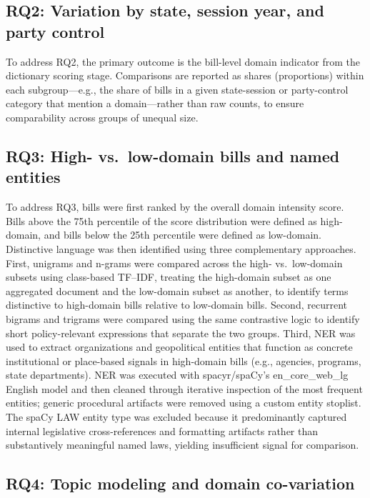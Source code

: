 \documentclass[10pt,twocolumn]{article}
\begin{document}
\subsection{RQ2: Variation by state, session year, and party
control}\label{rq2-variation-by-state-session-year-and-party-control}

To address RQ2, the primary outcome is the bill-level domain indicator
from the dictionary scoring stage. Comparisons are reported as shares
(proportions) within each subgroup---e.g., the share of bills in a given
state-session or party-control category that mention a domain---rather
than raw counts, to ensure comparability across groups of unequal size.

\subsection{RQ3: High- vs.~low-domain bills and named
entities}\label{rq3-high--vs.-low-domain-bills-and-named-entities}

To address RQ3, bills were first ranked by the overall domain intensity
score. Bills above the 75th percentile of the score distribution were
defined as high-domain, and bills below the 25th percentile were defined
as low-domain. Distinctive language was then identified using three
complementary approaches. First, unigrams and n-grams were compared
across the high- vs.~low-domain subsets using class-based TF--IDF,
treating the high-domain subset as one aggregated document and the
low-domain subset as another, to identify terms distinctive to
high-domain bills relative to low-domain bills. Second, recurrent
bigrams and trigrams were compared using the same contrastive logic to
identify short policy-relevant expressions that separate the two groups.
Third, NER was used to extract organizations and geopolitical entities
that function as concrete institutional or place-based signals in
high-domain bills (e.g., agencies, programs, state departments). NER was
executed with spacyr/spaCy's en\_core\_web\_lg English model and then
cleaned through iterative inspection of the most frequent entities;
generic procedural artifacts were removed using a custom entity
stoplist. The spaCy LAW entity type was excluded because it
predominantly captured internal legislative cross-references and
formatting artifacts rather than substantively meaningful named laws,
yielding insufficient signal for comparison.

\subsection{RQ4: Topic modeling and domain
co-variation}\label{rq4-topic-modeling-and-domain-co-variation}
\end{document}
